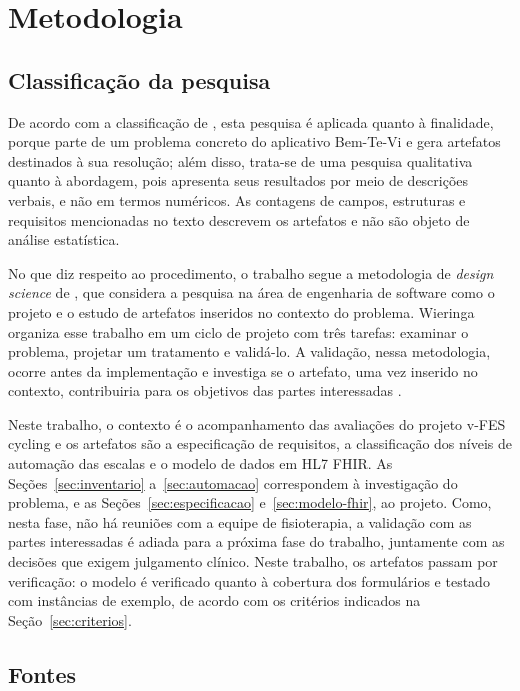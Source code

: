 \chapter{Metodologia}
\label{cap:metodologia}

\section{Classificação da pesquisa}
\label{sec:classificacao}

De acordo com a classificação de , esta pesquisa é aplicada quanto à finalidade, porque
parte de um problema concreto do aplicativo Bem-Te-Vi e gera artefatos destinados à sua resolução; além disso, 
trata-se de uma pesquisa qualitativa
quanto à abordagem, pois apresenta seus resultados por meio de descrições verbais, e não em termos numéricos.
As contagens de campos, estruturas e requisitos mencionadas no texto descrevem os artefatos e não são objeto
de análise estatística.

No que diz respeito ao procedimento, o trabalho segue a metodologia de \textit{design science} de
, que considera a pesquisa na área de engenharia de software como o projeto
e o estudo de artefatos inseridos no contexto do problema. Wieringa organiza
esse trabalho em um ciclo de projeto com três tarefas: examinar o problema, projetar um tratamento e validá-lo.
A validação, nessa metodologia,
ocorre antes da implementação e investiga se o artefato, uma vez inserido no contexto,
contribuiria para os objetivos das partes interessadas \cite[p.~27,~31]{wieringa2014design}.

Neste trabalho, o contexto é o acompanhamento das avaliações do projeto v-FES
cycling e os artefatos são a especificação de requisitos, a classificação dos níveis de automação
das escalas e o modelo de dados em HL7 FHIR. As Seções~\ref{sec:inventario} a~\ref{sec:automacao} correspondem à investigação do problema, e as
Seções~\ref{sec:especificacao} e~\ref{sec:modelo-fhir}, ao projeto. Como, nesta fase, não há reuniões com
a equipe de fisioterapia, a validação com as partes interessadas é adiada para a próxima fase do trabalho, juntamente com as decisões que exigem julgamento clínico. Neste trabalho, os artefatos
passam por verificação: o modelo é verificado quanto à cobertura dos formulários e testado com
instâncias de exemplo, de acordo com os critérios indicados na Seção~\ref{sec:criterios}.

\section{Fontes}
\label{sec:fontes}

